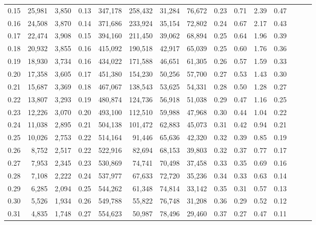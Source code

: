 \begin{tabular}{rrrrrrrrrrrrrrr}
0.15 &  25,981 &  3,850 &  0.13 &  347,178 &  258,432 &   31,284 &   76,672 &  0.23 &  0.71 &  2.39 &      0.47 \\
0.16 &  24,508 &  3,870 &  0.14 &  371,686 &  233,924 &   35,154 &   72,802 &  0.24 &  0.67 &  2.17 &      0.43 \\
0.17 &  22,474 &  3,908 &  0.15 &  394,160 &  211,450 &   39,062 &   68,894 &  0.25 &  0.64 &  1.96 &      0.39 \\
0.18 &  20,932 &  3,855 &  0.16 &  415,092 &  190,518 &   42,917 &   65,039 &  0.25 &  0.60 &  1.76 &      0.36 \\
0.19 &  18,930 &  3,734 &  0.16 &  434,022 &  171,588 &   46,651 &   61,305 &  0.26 &  0.57 &  1.59 &      0.33 \\
0.20 &  17,358 &  3,605 &  0.17 &  451,380 &  154,230 &   50,256 &   57,700 &  0.27 &  0.53 &  1.43 &      0.30 \\
0.21 &  15,687 &  3,369 &  0.18 &  467,067 &  138,543 &   53,625 &   54,331 &  0.28 &  0.50 &  1.28 &      0.27 \\
0.22 &  13,807 &  3,293 &  0.19 &  480,874 &  124,736 &   56,918 &   51,038 &  0.29 &  0.47 &  1.16 &      0.25 \\
0.23 &  12,226 &  3,070 &  0.20 &  493,100 &  112,510 &   59,988 &   47,968 &  0.30 &  0.44 &  1.04 &      0.22 \\
0.24 &  11,038 &  2,895 &  0.21 &  504,138 &  101,472 &   62,883 &   45,073 &  0.31 &  0.42 &  0.94 &      0.21 \\
0.25 &  10,026 &  2,753 &  0.22 &  514,164 &   91,446 &   65,636 &   42,320 &  0.32 &  0.39 &  0.85 &      0.19 \\
0.26 &   8,752 &  2,517 &  0.22 &  522,916 &   82,694 &   68,153 &   39,803 &  0.32 &  0.37 &  0.77 &      0.17 \\
0.27 &   7,953 &  2,345 &  0.23 &  530,869 &   74,741 &   70,498 &   37,458 &  0.33 &  0.35 &  0.69 &      0.16 \\
0.28 &   7,108 &  2,222 &  0.24 &  537,977 &   67,633 &   72,720 &   35,236 &  0.34 &  0.33 &  0.63 &      0.14 \\
0.29 &   6,285 &  2,094 &  0.25 &  544,262 &   61,348 &   74,814 &   33,142 &  0.35 &  0.31 &  0.57 &      0.13 \\
0.30 &   5,526 &  1,934 &  0.26 &  549,788 &   55,822 &   76,748 &   31,208 &  0.36 &  0.29 &  0.52 &      0.12 \\
0.31 &   4,835 &  1,748 &  0.27 &  554,623 &   50,987 &   78,496 &   29,460 &  0.37 &  0.27 &  0.47 &      0.11 \\

\end{tabular}
